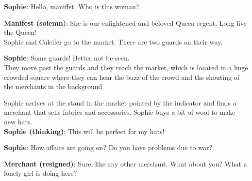\textbf{Sophie}: Hello, maniffst. Who is this woman?

\textbf{Manifest (solemn)}: She is our enlightened and beloved Queen regent. Long live the Queen!\\

\noindent Sophie and Calcifer go to the market. There are two guards on their way.

\textbf{Sophie}: Some guards! Better not be seen.\\

\noindent They move past the guards and they reach the market, which is located in a huge crowded square where they can hear the buzz of the crowd and the shouting of the merchants in the background


\noindent Sophie arrives at the stand in the market pointed by the indicator and finds a merchant that sells fabrics and accessories.
Sophie buys a bit of wool to make new hats.\\

\textbf{Sophie (thinking)}: This will be perfect for my hats!

\textbf{Sophie}: How affairs are going on? Do you have problems due to war?

\textbf{Merchant (resigned)}: Sure, like any other merchant. What about you? What a lonely girl is doing here?\\

